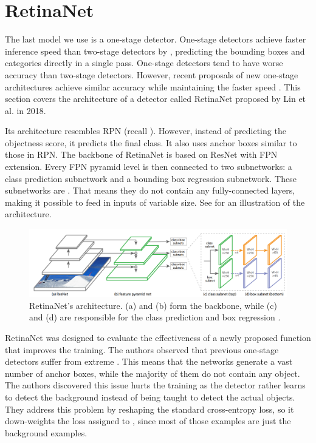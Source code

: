 \section{RetinaNet}
The last model we use is a one-stage detector. One-stage detectors achieve
faster inference speed than two-stage detectors by , predicting the bounding boxes and categories directly
in a single pass. One-stage detectors tend to have worse accuracy than
two-stage detectors.  However, recent proposals of new one-stage architectures
achieve similar accuracy while maintaining the faster speed \cite{retinanet,
    yolo3}. This section covers the architecture of a detector called RetinaNet
proposed by Lin et al. in 2018.

Its architecture resembles RPN (recall ). However, instead
of predicting the objectness score, it predicts the final class. It also uses
anchor boxes similar to those in RPN. The backbone of RetinaNet is based on
ResNet with FPN extension. Every FPN pyramid level is then connected to two
subnetworks: a class prediction subnetwork and a bounding box regression
subnetwork. These subnetworks are . That means
they do not contain any fully-connected layers, making it possible to feed
in inputs of variable size. See  for an illustration
of the architecture.

\begin{figure}[h]
    \centering
    \includegraphics[width=\linewidth]{Sources/Figures/retinanet.png}
    \caption{RetinaNet's architecture. (a) and (b) form the backbone, while (c)
        and (d) are responsible for the class prediction and box regression
        \cite{retinanet}.}
    \label{fig:retinanet}
\end{figure}

RetinaNet was designed to evaluate the effectiveness of a newly proposed
 function that improves the training. The authors observed that
previous one-stage detectors \cite{yolo1, yolo2, ssd} suffer from extreme
. This means that the networks
generate a vast number of anchor boxes, while the majority of them do not
contain any object. The authors discovered this issue hurts the training as the
detector rather learns to detect the background instead of being taught to
detect the actual objects. They address this problem by reshaping the standard
cross-entropy loss, so it down-weights the loss assigned to
, since most of those examples are just the
background examples.

